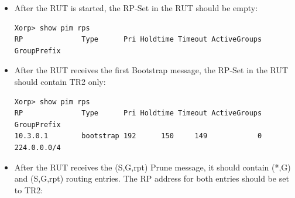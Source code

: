 \documentclass[11pt]{report}
\begin{document}
\begin{itemize}

  \item After the RUT is started, the RP-Set in the RUT should be empty:

\begin{verbatim}
Xorp> show pim rps 
RP              Type      Pri Holdtime Timeout ActiveGroups GroupPrefix       
\end{verbatim}

  \item After the RUT receives the first Bootstrap message, the RP-Set in the
  RUT should contain TR2 only:

\begin{verbatim}
Xorp> show pim rps 
RP              Type      Pri Holdtime Timeout ActiveGroups GroupPrefix       
10.3.0.1        bootstrap 192      150     149            0 224.0.0.0/4       
\end{verbatim}

  \item After the RUT receives the (S,G,rpt) Prune message, it should contain
  (*,G) and (S,G,rpt) routing entries. The RP address for both entries should
  be set to TR2:


\end{itemize}
\end{document}
